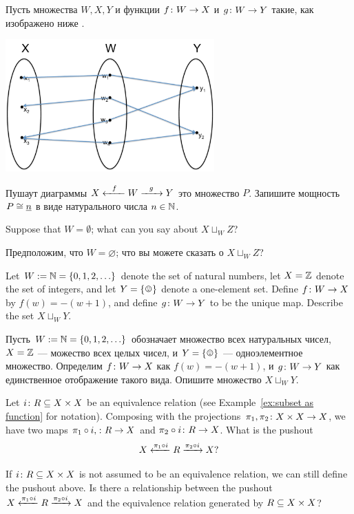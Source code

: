 \documentclass[CT4S-EN-RU]{subfiles}
\begin{document}
\begin{exerciseRUS}
Пусть множества $W,X,Y$ и функции $f\taking W\to X$ и $g\taking W\to Y$ такие, как изображено ниже . 
\begin{center}
\includegraphics[height=2in]{setPushout}
\end{center}
Пушаут диаграммы $X\Fromm{f}W\Too{g}Y$ это множество $P$. Запишите мощность $P\iso\ul{n}$ в виде натурального числа $n\in\NN$.  
\end{exerciseRUS}

\begin{exerciseENG}
Suppose that $W=\emptyset$; what can you say about $X\sqcup_WZ$? 
\end{exerciseENG}

\begin{exerciseRUS}
Предположим, что $W=\varnothing$; что вы можете сказать о $X\sqcup_WZ$? 
\end{exerciseRUS}

\begin{exerciseENG}
Let $W:=\NN=\{0,1,2,\ldots\}$ denote the set of natural numbers, let $X=\ZZ$ denote the set of integers, and let $Y=\singleton$ denote a one-element set. Define $f\taking W\to X$ by $f(w)= -(w+1)$, and define $g\taking W\to Y$ to be the unique map. Describe the set $X\sqcup_WY$.
\end{exerciseENG}

\begin{exerciseRUS}
Пусть $W:=\NN=\{0,1,2,\ldots\}$ обозначает множество всех натуральных чисел, $X=\ZZ$ — можество всех целых чисел, и $Y=\singleton$ — одноэлементное множество. Определим $f\taking W\to X$ как $f(w)= -(w+1)$, и $g\taking W\to Y$ как единственное отображение такого вида. Опишите множество $X\sqcup_WY$.
\end{exerciseRUS}

\begin{exerciseENG}
Let $i\taking R\ss X\times X$ be an equivalence relation (see Example~\ref{ex:subset as function} for notation). Composing with the projections $\pi_1,\pi_2\taking X\times X\to X$, we have two maps $\pi_1\circ i,\taking R\to X$ and $\pi_2\circ i\taking R\to X$. 
\sexc What is the pushout $$X\From{\pi_1\circ i}R\To{\pi_2\circ i}X?$$ 
\item If $i\taking R\ss X\times X$ is not assumed to be an equivalence relation, we can still define the pushout above. Is there a relationship between the pushout $X\From{\pi_1\circ i}R\To{\pi_2\circ i}X$ and the equivalence relation generated by $R\ss X\times X$?
\endsexc
\end{exerciseENG}
\end{document}

